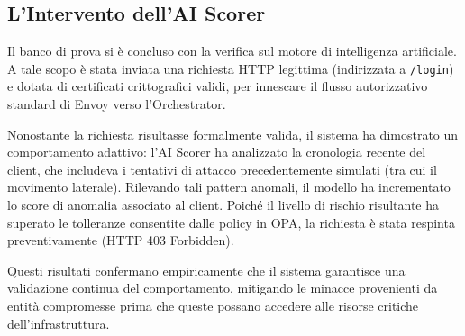 \subsection{L'Intervento dell'AI Scorer}
Il banco di prova si è concluso con la verifica sul motore di intelligenza artificiale. A tale scopo è stata inviata una richiesta HTTP legittima (indirizzata a \texttt{/login}) e dotata di certificati crittografici validi, per innescare il flusso autorizzativo standard di Envoy verso l'Orchestrator.

Nonostante la richiesta risultasse formalmente valida, il sistema ha dimostrato un comportamento adattivo: l'AI Scorer ha analizzato la cronologia recente del client, che includeva i tentativi di attacco precedentemente simulati (tra cui il movimento laterale). Rilevando tali pattern anomali, il modello ha incrementato lo score di anomalia associato al client. Poiché il livello di rischio risultante ha superato le tolleranze consentite dalle policy in OPA, la richiesta è stata respinta preventivamente (HTTP 403 Forbidden).

Questi risultati confermano empiricamente che il sistema garantisce una validazione continua del comportamento, mitigando le minacce provenienti da entità compromesse prima che queste possano accedere alle risorse critiche dell'infrastruttura.
